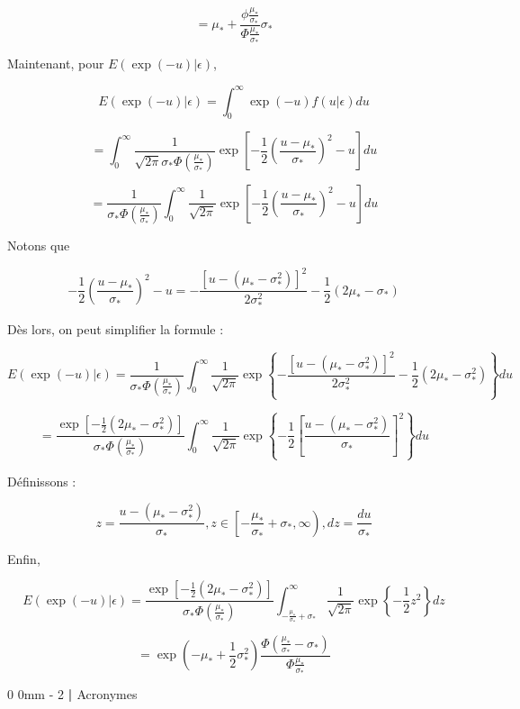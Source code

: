 \documentclass[
  12pt,
]{report}
\makeatletter
\renewcommand{\chapter}{%
    \clearpage %
    \@startsection{chapter}%
    {0} %
    {0mm} %
    {-\baselineskip} %
    {2\baselineskip} %
    {\normalfont\Huge\bfseries | \Huge\bfseries}%
}
\makeatother
\begin{document}
\[
= \mu_* + \frac{\phi \frac{\mu_*}{\sigma_*}}{\Phi \frac{\mu_*}{\sigma_*}} \sigma_*
\]

Maintenant, pour \(E(\exp(- u) | \epsilon)\),

\[
E(\exp(- u)| \epsilon) = \int_{0}^{\infty} \exp(-u) f(u | \epsilon) du 
\]

\[
= \int_{0}^{\infty} \frac{1}{\sqrt{2 \pi}\sigma_* \Phi(\frac{\mu_*}{\sigma_*})} \exp\left[- \frac{1}{2}\left(\frac{u - \mu_*}{\sigma_*}\right)^2 - u\right] du
\]

\[
= \frac{1}{\sigma_* \Phi(\frac{\mu_*}{\sigma_*})} \int_{0}^{\infty} \frac{1}{\sqrt{2 \pi}} \exp \left[- \frac{1}{2}\left(\frac{u - \mu_*}{\sigma_*}\right)^2 - u\right]du
\]

Notons que

\[
- \frac{1}{2}\left(\frac{u - \mu_*}{\sigma_*}\right)^2 - u = - \frac{[u - ( \mu_* - \sigma_*^2)]^2}{2 \sigma_*^2} - \frac{1}{2} (2\mu_* - \sigma_*)
\]

Dès lors, on peut simplifier la formule :

\[
E(\exp(-u) | \epsilon) = \frac{1}{\sigma_* \Phi(\frac{\mu_*}{\sigma_*})}  \int_{0}^{\infty} \frac{1}{\sqrt{2 \pi}} \exp \left\{ - \frac{[ u - ( \mu_* - \sigma_*^2)]^2}{2 \sigma_*^2} - \frac{1}{2} (2\mu_* - \sigma_*^2)\right\} du
\]

\[
= \frac{\exp \left[- \frac{1}{2} (2\mu_* - \sigma_*^2) \right]}{\sigma_* \Phi (\frac{\mu_*}{\sigma_*})}  \int_{0}^{\infty} \frac{1}{\sqrt{2 \pi}} \exp \left\{-\frac{1}{2} \left[\frac{u - (\mu_* - \sigma_*^2)}{\sigma_*} \right]^2 \right\}du
\]

Définissons :

\[
z = \frac{u - (\mu_* - \sigma_*^2)}{\sigma_*}, z \in \left[ -\frac{\mu_*}{\sigma_*} + \sigma_*, \infty \right), dz = \frac{du}{\sigma_*}
\]

Enfin,

\[
E(\exp(-u)| \epsilon) = \frac{\exp \left[- \frac{1}{2} (2\mu_* - \sigma_*^2) \right]}{\sigma_* \Phi (\frac{\mu_*}{\sigma_*})} \int_{-\frac{\mu_*}{\sigma_*} + \sigma_*}^{\infty} \frac{1}{\sqrt{2 \pi}} \exp \left\{ - \frac{1}{2} z^2\right\} dz
\]

\[
= \exp \left(-\mu_* + \frac{1}{2} \sigma_*^2 \right) \frac{\Phi \left(\frac{\mu_*}{\sigma_*} - \sigma_* \right)}{\Phi\frac{\mu_*}{\sigma_*}}
\]

\chapter{Acronymes}\label{acronymes}
\end{document}
